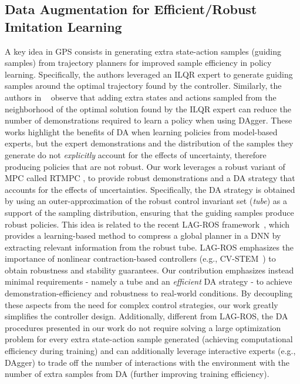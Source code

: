 \noindent 
\subsection{Data Augmentation for Efficient/Robust Imitation Learning}
A key idea in \ac{GPS} \cite{levine2013guided} consists in generating extra state-action samples (guiding samples) from trajectory planners for improved sample efficiency in policy learning. Specifically, the authors leveraged an \ac{ILQR} \cite{li2004iterative} expert to generate guiding samples around the optimal trajectory found by the controller. Similarly, the authors in ~\cite{carius2020mpc} observe that adding extra states and actions sampled from the neighborhood of the optimal solution found by the \ac{ILQR} expert can reduce the number of demonstrations required to learn a policy when using DAgger. These works highlight the benefits of \ac{DA} when learning policies from model-based experts, but the expert demonstrations and the distribution of the samples they generate do not \textit{explicitly} account for the effects of uncertainty, therefore producing policies that are not robust. %
Our work leverages a robust variant of \ac{MPC} called \ac{RTMPC} \cite{mayne2005robust, mayne2011tube}, to provide robust demonstrations and a \ac{DA} strategy that accounts for the effects of uncertainties. Specifically, the \ac{DA} strategy is obtained by using an outer-approximation of the robust control invariant set (\textit{tube}) as a support of the sampling distribution, ensuring that the guiding samples produce robust policies. 
This idea is related to the recent LAG-ROS framework~\cite{tsukamoto2021learning}, which provides a learning-based method to compress a global planner in a \ac{DNN} by extracting relevant information from the robust tube. LAG-ROS emphasizes the importance of nonlinear contraction-based controllers (e.g., CV-STEM~\cite{tsukamoto2020neural}) to obtain robustness and stability guarantees. 
Our contribution emphasizes instead minimal requirements - namely a tube and an \textit{efficient} \ac{DA} strategy - to achieve demonstration-efficiency and robustness to real-world conditions. By decoupling these aspects from the need for complex control strategies, our work greatly simplifies the controller design. Additionally, different from LAG-ROS, the \ac{DA} procedures presented in our work do not require solving a large optimization problem for every extra state-action sample generated (achieving computational efficiency during training) 
and can additionally leverage interactive experts (e.g., DAgger) to trade off the number of interactions with the environment with the number of extra samples from \ac{DA} (further improving training efficiency).  



